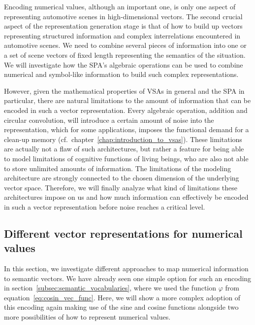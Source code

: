 Encoding numerical values, although an important one, is only one aspect of representing automotive scenes in high-dimensional vectors.
The second crucial aspect of the representation generation stage is that of how to build up vectors representing structured information and complex interrelations encountered in automotive scenes.
We need to combine several pieces of information into one or a set of scene vectors of fixed length representing the semantics of the situation.
We will investigate how the \ac{SPA}'s algebraic operations can be used to combine numerical and symbol-like information to build such complex representations.

However, given the mathematical properties of \acp{VSA} in general and the \ac{SPA} in particular, there are natural limitations to the amount of information that can be encoded in such a vector representation.
Every algebraic operation, addition and circular convolution, will introduce a certain amount of noise into the representation, which for some applications, imposes the functional demand for a clean-up memory (cf.\ chapter~\ref{chap:introduction_to_vsas}).
These limitations are actually not a flaw of such architectures, but rather a feature for being able to model limitations of cognitive functions of living beings, who are also not able to store unlimited amounts of information.
The limitations of the modeling architecture are strongly connected to the chosen dimension of the underlying vector space.
Therefore, we will finally analyze what kind of limitations these architectures impose on us and how much information can effectively be encoded in such a vector representation before noise reaches a critical level.

\subsection{Different vector representations for numerical values}%
\label{subsec:different_vector_representations_for_numerical_values}

In this section, we investigate different approaches to map numerical information to semantic vectors.
We have already seen one simple option for such an encoding in section~\ref{subsec:semantic_vocabularies}, where we used the function $\varphi$ from equation~\eqref{eq:cosin_vec_func}.
Here, we will show a more complex adoption of this encoding again making use of the sine and cosine functions alongside two more possibilities of how to represent numerical values.

